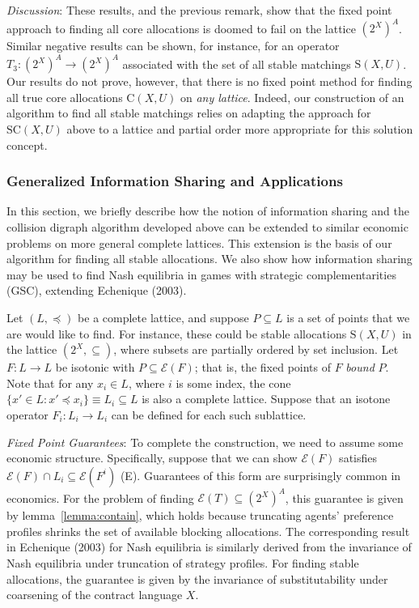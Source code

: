 \documentclass[11pt,reqno]{amsart}
\theoremstyle{definition}
\numberwithin{equation}{section}
\newcommand{\prealloc}{(2^X)^A}
\newcommand{\sub}{\subseteq}
\newcommand{\strcore}{\mathrm{SC}(X,U)}
\newcommand{\core}{\mathrm{C}(X,U)}
\newcommand{\stable}{\mathrm{S}(X,U)}
\newcommand{\fix}{\mathcal{E}}
\newcommand{\peq}{\preceq}
\newcommand{\opthree}{T_3}
\newcommand{\oper}{F}
\newcommand{\point}{P}
\newcommand{\lattice}{L}
\begin{document}
\emph{Discussion}: These results, and the previous remark, show that the fixed point approach to finding all core allocations is doomed to fail on the lattice $\prealloc$.
Similar negative results can be shown, for instance, for an operator $\opthree: \prealloc \to \prealloc$ associated with the set of all stable matchings $\stable$.
Our results do not prove, however, that there is no fixed point method for finding all true core allocations $\core$ on \emph{any lattice}.
Indeed, our construction of an algorithm to find all stable matchings relies on adapting the approach for $\strcore$ above to a lattice and partial order more appropriate for this solution concept. 

\subsubsection{Generalized Information Sharing and Applications} \label{section:general}
In this section, we briefly describe how the notion of information sharing and the collision digraph algorithm developed above can be extended to similar economic problems on more general complete lattices.
This extension is the basis of our algorithm for finding all stable allocations. 
We also show how information sharing may be used to find Nash equilibria in games with strategic complementarities (GSC), extending Echenique (2003).

Let $(\lattice,\peq)$ be a complete lattice, and suppose $\point \sub \lattice$ is a set of points that we are would like to find. 
For instance, these could be stable allocations $\stable$ in the lattice $(2^X,\sub)$, where subsets are partially ordered by set inclusion. 
Let $\oper: \lattice \to \lattice$ be isotonic with $\point \sub \fix(\oper)$; that is, the fixed points of $\oper$ \emph{bound} $\point$.
Note that for any $x_i \in \lattice$, where $i$ is some index, the cone $\{x' \in \lattice: x' \peq x_i\} \equiv \lattice_i \sub L$ is also a complete lattice.
Suppose that an isotone operator $F_i : \lattice_i \to \lattice_i$ can be defined for each such sublattice.

\emph{Fixed Point Guarantees}: To complete the construction, we need to assume some economic structure. 
Specifically, suppose that we can show $\fix(\oper)$ satisfies $\fix(\oper) \cap \lattice_i \sub \fix(\oper^i)$ (E).
Guarantees of this form are surprisingly common in economics.
For the problem of finding $\fix(T) \sub \prealloc$, this guarantee is given by lemma~\ref{lemma:contain}, which holds because truncating agents' preference profiles shrinks the set of available blocking allocations.
The corresponding result in Echenique (2003) for Nash equilibria is similarly derived from the invariance of Nash equilibria under truncation of strategy profiles.
For finding stable allocations, the guarantee is given by the invariance of substitutability under coarsening of the contract language $X$.
\end{document}
